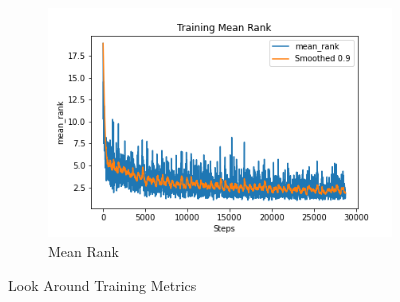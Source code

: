 \begin{figure}[H]
     \begin{subfigure}[b]{0.3\textwidth}
         \centering
         \includegraphics[width=\textwidth]{./figure/results/look_around/training/mean_rank.png}
         \caption{Mean Rank}
         \label{fig:la_t_mean_rank}
     \end{subfigure}
     \caption{Look Around Training Metrics}
     \label{fig:la_t_metrics}
\end{figure}

